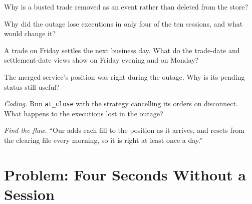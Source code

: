 \begin{exercise}[$\star$]\label{exo:pl:position-and-pnl-services:3}
Why is a busted trade removed as an event rather than deleted from the store?
\end{exercise}

\begin{exercise}[$\star\star$]\label{exo:pl:position-and-pnl-services:4}
Why did the outage lose executions in only four of the ten sessions, and what would change it?
\end{exercise}

\begin{exercise}[$\star\star$]\label{exo:pl:position-and-pnl-services:5}
A trade on Friday settles the next business day. What do the trade-date and settlement-date views show on Friday evening and on Monday?
\end{exercise}

\begin{exercise}[$\star\star$]\label{exo:pl:position-and-pnl-services:6}
The merged service's position was right during the outage. Why is its pending status still useful?
\end{exercise}

\begin{exercise}[$\star\star\star$]\label{exo:pl:position-and-pnl-services:7}
\emph{Coding.} Run \texttt{at\_close} with the strategy cancelling its orders on disconnect. What happens to the executions lost in the outage?
\end{exercise}

\begin{exercise}[$\star\star\star$]\label{exo:pl:position-and-pnl-services:8}
\emph{Find the flaw.} ``Our  adds each fill to the position as it arrives, and resets from the clearing file every morning, so
it is right at least once a day.''
\end{exercise}

\section{Problem: Four Seconds Without a Session}

